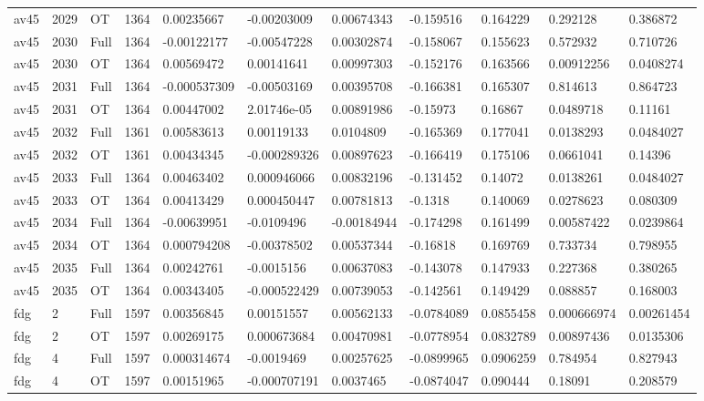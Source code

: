 \begin{landscape}
\begin{longtable}{lllllllllll}
av45 & 2029 & OT & 1364 & 0.00235667 & -0.00203009 & 0.00674343 & -0.159516 & 0.164229 & 0.292128 & 0.386872 \\
av45 & 2030 & Full & 1364 & -0.00122177 & -0.00547228 & 0.00302874 & -0.158067 & 0.155623 & 0.572932 & 0.710726 \\
av45 & 2030 & OT & 1364 & 0.00569472 & 0.00141641 & 0.00997303 & -0.152176 & 0.163566 & 0.00912256 & 0.0408274 \\
av45 & 2031 & Full & 1364 & -0.000537309 & -0.00503169 & 0.00395708 & -0.166381 & 0.165307 & 0.814613 & 0.864723 \\
av45 & 2031 & OT & 1364 & 0.00447002 & 2.01746e-05 & 0.00891986 & -0.15973 & 0.16867 & 0.0489718 & 0.11161 \\
av45 & 2032 & Full & 1361 & 0.00583613 & 0.00119133 & 0.0104809 & -0.165369 & 0.177041 & 0.0138293 & 0.0484027 \\
av45 & 2032 & OT & 1361 & 0.00434345 & -0.000289326 & 0.00897623 & -0.166419 & 0.175106 & 0.0661041 & 0.14396 \\
av45 & 2033 & Full & 1364 & 0.00463402 & 0.000946066 & 0.00832196 & -0.131452 & 0.14072 & 0.0138261 & 0.0484027 \\
av45 & 2033 & OT & 1364 & 0.00413429 & 0.000450447 & 0.00781813 & -0.1318 & 0.140069 & 0.0278623 & 0.080309 \\
av45 & 2034 & Full & 1364 & -0.00639951 & -0.0109496 & -0.00184944 & -0.174298 & 0.161499 & 0.00587422 & 0.0239864 \\
av45 & 2034 & OT & 1364 & 0.000794208 & -0.00378502 & 0.00537344 & -0.16818 & 0.169769 & 0.733734 & 0.798955 \\
av45 & 2035 & Full & 1364 & 0.00242761 & -0.0015156 & 0.00637083 & -0.143078 & 0.147933 & 0.227368 & 0.380265 \\
av45 & 2035 & OT & 1364 & 0.00343405 & -0.000522429 & 0.00739053 & -0.142561 & 0.149429 & 0.088857 & 0.168003 \\
fdg & 2 & Full & 1597 & 0.00356845 & 0.00151557 & 0.00562133 & -0.0784089 & 0.0855458 & 0.000666974 & 0.00261454 \\
fdg & 2 & OT & 1597 & 0.00269175 & 0.000673684 & 0.00470981 & -0.0778954 & 0.0832789 & 0.00897436 & 0.0135306 \\
fdg & 4 & Full & 1597 & 0.000314674 & -0.0019469 & 0.00257625 & -0.0899965 & 0.0906259 & 0.784954 & 0.827943 \\
fdg & 4 & OT & 1597 & 0.00151965 & -0.000707191 & 0.0037465 & -0.0874047 & 0.090444 & 0.18091 & 0.208579 \\

\end{longtable}
\end{landscape}
